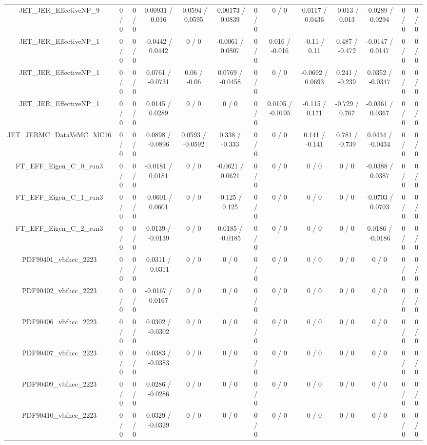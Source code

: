 \documentclass[10pt]{article}
\begin{document}
\begin{table}[htbp]
\begin{center}
\begin{tabular}{|c|c|c|c|c|c|c|c|c|c|c|c|c|}
  JET_JER_EffectiveNP_9 & 0 / 0 & 0 / 0 & 0.00931 / 0.016 & -0.0594 / 0.0595 & -0.00173 / 0.0839 & 0 / 0 & 0 / 0 & 0.0117 / 0.0436 & -0.013 / 0.013 & -0.0289 / 0.0294 & 0 / 0 & 0 / 0 \\ 
  JET_JER_EffectiveNP_1 & 0 / 0 & 0 / 0 & -0.0442 / 0.0442 & 0 / 0 & -0.0061 / 0.0807 & 0 / 0 & 0.016 / -0.016 & -0.11 / 0.11 & 0.487 / -0.472 & -0.0147 / 0.0147 & 0 / 0 & 0 / 0 \\ 
  JET_JER_EffectiveNP_1 & 0 / 0 & 0 / 0 & 0.0761 / -0.0731 & 0.06 / -0.06 & 0.0769 / -0.0458 & 0 / 0 & 0 / 0 & -0.0692 / 0.0693 & 0.241 / -0.239 & 0.0352 / -0.0347 & 0 / 0 & 0 / 0 \\ 
  JET_JER_EffectiveNP_1 & 0 / 0 & 0 / 0 & 0.0145 / 0.0289 & 0 / 0 & 0 / 0 & 0 / 0 & 0.0105 / -0.0105 & -0.115 / 0.171 & -0.729 / 0.767 & -0.0361 / 0.0367 & 0 / 0 & 0 / 0 \\ 
  JET_JERMC_DataVsMC_MC16 & 0 / 0 & 0 / 0 & 0.0898 / -0.0896 & 0.0593 / -0.0592 & 0.338 / -0.333 & 0 / 0 & 0 / 0 & 0.141 / -0.141 & 0.781 / -0.739 & 0.0434 / -0.0434 & 0 / 0 & 0 / 0 \\ 
  FT_EFF_Eigen_C_0_run3 & 0 / 0 & 0 / 0 & -0.0181 / 0.0181 & 0 / 0 & -0.0621 / 0.0621 & 0 / 0 & 0 / 0 & 0 / 0 & 0 / 0 & -0.0388 / 0.0387 & 0 / 0 & 0 / 0 \\ 
  FT_EFF_Eigen_C_1_run3 & 0 / 0 & 0 / 0 & -0.0601 / 0.0601 & 0 / 0 & -0.125 / 0.125 & 0 / 0 & 0 / 0 & 0 / 0 & 0 / 0 & -0.0703 / 0.0703 & 0 / 0 & 0 / 0 \\ 
  FT_EFF_Eigen_C_2_run3 & 0 / 0 & 0 / 0 & 0.0139 / -0.0139 & 0 / 0 & 0.0185 / -0.0185 & 0 / 0 & 0 / 0 & 0 / 0 & 0 / 0 & 0.0186 / -0.0186 & 0 / 0 & 0 / 0 \\ 
  PDF90401_vbfhcc_2223 & 0 / 0 & 0 / 0 & 0.0311 / -0.0311 & 0 / 0 & 0 / 0 & 0 / 0 & 0 / 0 & 0 / 0 & 0 / 0 & 0 / 0 & 0 / 0 & 0 / 0 \\ 
  PDF90402_vbfhcc_2223 & 0 / 0 & 0 / 0 & -0.0167 / 0.0167 & 0 / 0 & 0 / 0 & 0 / 0 & 0 / 0 & 0 / 0 & 0 / 0 & 0 / 0 & 0 / 0 & 0 / 0 \\ 
  PDF90406_vbfhcc_2223 & 0 / 0 & 0 / 0 & 0.0302 / -0.0302 & 0 / 0 & 0 / 0 & 0 / 0 & 0 / 0 & 0 / 0 & 0 / 0 & 0 / 0 & 0 / 0 & 0 / 0 \\ 
  PDF90407_vbfhcc_2223 & 0 / 0 & 0 / 0 & 0.0383 / -0.0383 & 0 / 0 & 0 / 0 & 0 / 0 & 0 / 0 & 0 / 0 & 0 / 0 & 0 / 0 & 0 / 0 & 0 / 0 \\ 
  PDF90409_vbfhcc_2223 & 0 / 0 & 0 / 0 & 0.0286 / -0.0286 & 0 / 0 & 0 / 0 & 0 / 0 & 0 / 0 & 0 / 0 & 0 / 0 & 0 / 0 & 0 / 0 & 0 / 0 \\ 
  PDF90410_vbfhcc_2223 & 0 / 0 & 0 / 0 & 0.0329 / -0.0329 & 0 / 0 & 0 / 0 & 0 / 0 & 0 / 0 & 0 / 0 & 0 / 0 & 0 / 0 & 0 / 0 & 0 / 0 \\ 

\end{tabular}
\end{center}
\end{table}
\end{document}

